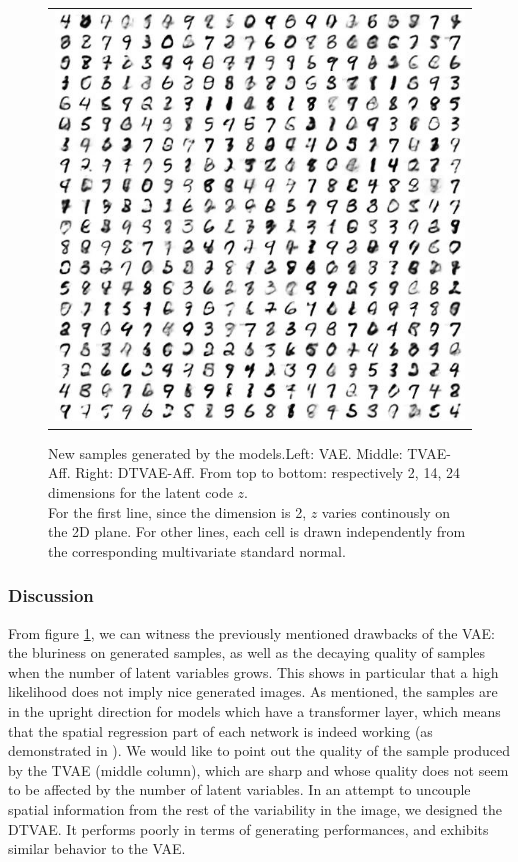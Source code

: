 \documentclass[letterpaper, twoside]{article}
\begin{document}
\begin{figure}[H]
\begin{minipage}{.33\textwidth}
\begin{tabular}{|@{}c@{}|}
\includegraphics[scale=0.5]{manifold_34.jpg}\\
\end{tabular}
\end{minipage}

\caption{New samples generated by the models.Left: VAE. Middle: TVAE-Aff. Right: DTVAE-Aff. From top to bottom: respectively 2, 14, 24 dimensions for the latent code $z$.\\ For the first line, since the dimension is 2, $z$ varies continously on the 2D plane. For other lines, each cell is drawn independently from the corresponding multivariate standard normal.}
\label{generatedcomparison}
\end{figure}

\subsubsection{Discussion}

From figure \ref{generatedcomparison}, we can witness the previously mentioned drawbacks of the VAE: the bluriness on generated samples, as well as the decaying quality of samples when the number of latent variables grows. This shows in particular that a high likelihood does not imply nice generated images. As mentioned, the samples are in the upright direction for models which have a transformer layer, which means that the spatial regression part of each network is indeed working (as demonstrated in \cite{Siyu:vae}). We would like to point out the quality of the sample produced by the TVAE (middle column), which are sharp and whose quality does not seem to be affected by the number of latent variables. In an attempt to uncouple spatial information from the rest of the variability in the image, we designed the DTVAE. It performs poorly in terms of generating performances, and exhibits similar behavior to the VAE.\\
\end{document}
